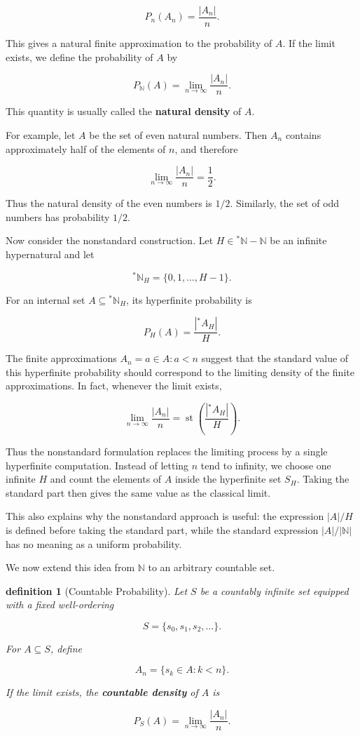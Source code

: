 \documentclass[10pt,a4paper]{book}
\newtheorem{definition}{definition}[section]
\begin{document}
$$
    P_{n}(A_n)=\frac{|A_n|}{n}.
$$

This gives a natural finite approximation to the probability of $A$. If the limit exists, we define the probability of $A$ by

$$
    P_{\mathbb N}(A)=\lim_{n\to\infty}\frac{|A_n|}{n}.
$$

This quantity is usually called the \textbf{natural density} of $A$.

For example, let $A$ be the set of even natural numbers. Then $A_n$ contains approximately half of the elements of $n$, and therefore

$$
    \lim_{n\to\infty}\frac{|A_n|}{n}=\frac12.
$$

Thus the natural density of the even numbers is $1/2$. Similarly, the set of odd numbers has probability $1/2$.

Now consider the nonstandard construction. Let $H\in{}^*\mathbb N-\mathbb N$ be an infinite hypernatural and let

$$
    {}^*\mathbb{N}_H=\{0,1,\ldots,H-1\}.
$$

For an internal set $A\subseteq {}^*\mathbb{N}_H$, its hyperfinite probability is

$$
    P_H(A)=\frac{|{}^*A_H|}{H}.
$$

The finite approximations $A_n={a\in A:a<n}$ suggest that the standard value of this hyperfinite probability should correspond to the limiting density of the finite approximations. In fact, whenever the limit exists,

$$
    \lim_{n\to\infty}\frac{|A_n|}{n}
    =
    \operatorname{st}\left(\frac{|{}^*A_H|}{H}\right).
$$

Thus the nonstandard formulation replaces the limiting process by a single hyperfinite computation. Instead of letting $n$ tend to infinity, we choose one infinite $H$ and count the elements of $A$ inside the hyperfinite set $S_H$. Taking the standard part then gives the same value as the classical limit.

This also explains why the nonstandard approach is useful: the expression $|A|/H$ is defined before taking the standard part, while the standard expression $|A|/|\mathbb N|$ has no meaning as a uniform probability.

We now extend this idea from $\mathbb N$ to an arbitrary countable set.



\begin{definition}[Countable Probability]
    Let $S$ be a countably infinite set equipped with a fixed well-ordering

    $$
        S=\{s_0,s_1,s_2,\ldots\}.
    $$

    For $A\subseteq S$, define

    $$
        A_n=\{s_k\in A:k<n\}.
    $$

    If the limit exists, the \textbf{countable density} of $A$ is

    $$
        P_S(A)=\lim_{n\to\infty}\frac{|A_n|}{n}.
    $$

\end{definition}
\end{document}
